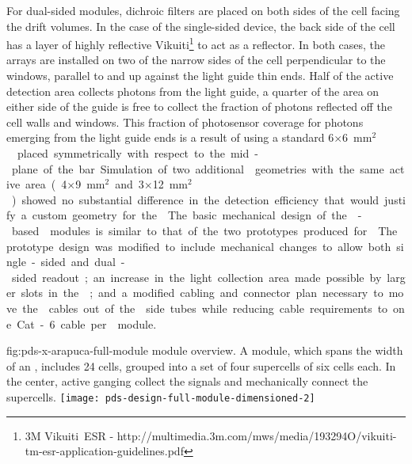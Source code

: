 For dual-sided  modules, dichroic filters are placed on both sides of the cell facing the drift volumes.  In the case of the single-sided device, the back side of the cell has a layer of highly reflective Vikuiti\footnote{3M Vikuiti\texttrademark\  ESR - http://multimedia.3m.com/mws/media/193294O/vikuiti-tm-esr-application-guidelines.pdf} to act as a  reflector.  In both cases, the  arrays are installed on two of the narrow sides of the cell perpendicular to the windows, parallel to and up against the light guide thin ends. Half of the  active detection area collects photons from the light guide, a quarter of the area on either side of the guide is free to collect the fraction of photons reflected off the cell walls and windows. 
This fraction of photosensor coverage for photons emerging from the light guide ends is a result of using a standard \num{6}$\times$\SI{6}{mm$^2$}  placed symmetrically with respect to the mid-plane of the bar. Simulation of two additional  geometries with the same active area (\num{4}$\times$\SI{9}{mm$^2$} and \num{3}$\times$\SI{12}{mm$^2$}) showed no substantial difference in the detection efficiency that would justify a custom geometry for the .

The basic mechanical design of the -based  modules is similar to that of the two prototypes produced for . 
The prototype design was modified to include mechanical changes to allow both single-sided and dual-sided readout; an increase in the light collection area made possible by larger slots in the ; and a modified cabling and connector plan necessary to move the  cables out of the  side tubes while reducing cable requirements to one Cat-6 cable per  module.

\begin{dunefigure}
{fig:pds-x-arapuca-full-module}
{ module overview. A module, which spans the width of an , includes 24
  cells, grouped into a set of four supercells of six cells each. In the center, active ganging  collect the signals and mechanically connect the supercells.}
   \texttt{[image: pds-design-full-module-dimensioned-2]}
\end{dunefigure}

